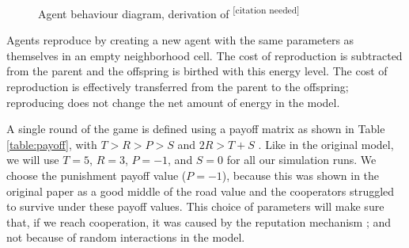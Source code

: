 \documentclass[english]{article}
\newcommand{\citationneeded}{\textsuperscript{\color{blue} [citation needed]}}
\begin{document}
\begin{figure}[h]
  \centering
  \caption{Agent behaviour diagram, derivation of \citationneeded}
  \label{fig:agent_behaviour}
\end{figure}

Agents reproduce by creating a new agent with the same parameters as themselves in an empty neighborhood cell.
The cost of reproduction is subtracted from the parent and the offspring is birthed with this energy level.
The cost of reproduction is effectively transferred from the parent to the offspring;
reproducing does not change the net amount of energy in the model.

A single round of the game is defined using a payoff matrix as shown in Table \ref{table:payoff}, with $T > R > P > S$ and $2R > T + S$ \citep{chammah1965}.
Like in the original model, we will use $T = 5$, $R = 3$, $P = -1$, and $S = 0$ for all our simulation runs.
We choose the punishment payoff value ($P = -1$), because this was shown in the original paper as a good
middle of the road value and the cooperators struggled to survive under these payoff values.
This choice of parameters will make sure that, if we reach cooperation, it was caused by the reputation mechanism
; and not because of random interactions in the model.
\end{document}

